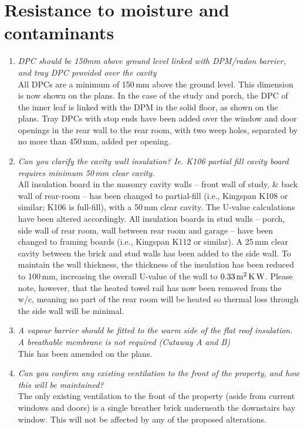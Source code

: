 \documentclass{extension}
\begin{document}
\section{Resistance to moisture and contaminants}
\begin{enumerate}
\item {\it DPC should be 150mm above ground level linked with DPM/radon barrier, and tray DPC provided over the cavity}\\
All DPCs are a minimum of 150\,mm above the ground level. This dimension is now shown on the plans. In the case of the study and porch, the DPC of the inner leaf is linked with the DPM in the solid floor, as shown on the plans. Tray DPCs with stop ends have been added over the window and door openings in the rear wall to the rear room, with two weep holes, separated by no more than 450\,mm, added per opening.
\item {\it Can you clarify the cavity wall insulation? Ie. K106 partial fill cavity board requires minimum 50\,mm clear cavity.}\\
All insulation board in the masonry cavity walls -- front wall of study, \& back wall of rear-room -- has been changed to partial-fill (i.e., Kingspan K108 or similar; K106 is full-fill), with a 50\,mm clear cavity. The U-value calculations have been altered accordingly. All insulation boards in stud walls -- porch, side wall of rear room, wall between rear room and garage -- have been changed to framing boards (i.e., Kingspan K112 or similar). A 25\,mm clear cavity between the brick and stud walls has been added to the side wall. To maintain the wall thickness, the thickness of the insulation has been reduced to 100\,mm, increasing the overall U-value of the wall to $0.33\,{\rm m^2\,K\,W}$. Please note, however, that the heated towel rail has now been removed from the w/c, meaning no part of the rear room will be heated so thermal loss through the side wall will be minimal.
\item {\it A vapour barrier should be fitted to the warm side of the flat roof insulation. A breathable membrane is not required (Cutaway A and B)}\\
This has been amended on the plans.
\item {\it Can you confirm any existing ventilation to the front of the property, and how this will be maintained?}\\
The only existing ventilation to the front of the property (aside from current windows and doors) is a single breather brick underneath the downstairs bay window. This will not be affected by any of the proposed alterations.
\end{enumerate}
\end{document}

